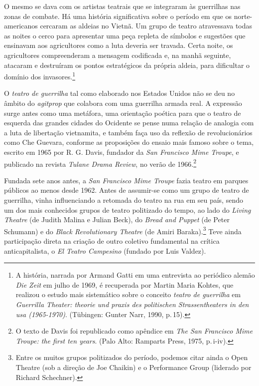 O mesmo se dava com os artistas teatrais que se integraram às guerrilhas
nas zonas de combate. Há uma história significativa sobre o período em
que os norte-americanos cercaram as aldeias no Vietnã. Um grupo de
teatro atravessava todas as noites o cerco para apresentar uma peça
repleta de símbolos e sugestões que ensinavam aos agricultores como a
luta deveria ser travada. Certa noite, os agricultores compreenderam a
mensagem codificada e, na manhã seguinte, atacaram e destruíram os
pontos estratégicos da própria aldeia, para dificultar o domínio dos
invasores.\footnote{A história, narrada por Armand Gatti em uma
  entrevista ao periódico alemão {\it Die Zeit} em julho de 1969, é
  recuperada por Martin Maria Kohtes, que realizou o estudo mais
  sistemático sobre o conceito {\it teatro de guerrilha} em
  {\it Guerrilla Theater: theorie und praxis des politischen
  Strassentheaters in den {\sc usa} (1965-1970)}. (Tübingen: Gunter Narr,
  1990, p.\,15).}

\subject{Conceito estadunidense de Teatro de guerrilha}

O {\it teatro de guerrilha} tal como elaborado nos Estados Unidos não se
deu no âmbito do {\it agitprop} que colabora com uma guerrilha armada
real. A expressão surge antes como uma metáfora, uma orientação poética
para que o teatro de esquerda das grandes cidades do Ocidente se pense
numa relação de analogia com a luta de libertação vietnamita, e também
faça uso da reflexão de revolucionários como Che Guevara, conforme as
proposições do ensaio mais famoso sobre o tema, escrito em 1965 por R.
G. Davis, fundador da {\it San Francisco Mime Troupe}, e publicado na
revista {\it Tulane Drama Review}, no verão de 1966.\footnote{O texto de
  Davis foi republicado como apêndice em {\it The San Francisco Mime
  Troupe: the first ten years}. (Palo Alto: Ramparts Press, 1975, p.\,i-iv).}

Fundada sete anos antes, a {\it San Francisco Mime Troupe} fazia teatro
em parques públicos ao menos desde 1962. Antes de assumir-se como um
grupo de teatro de guerrilha, vinha influenciando a retomada do teatro
na rua em seu país, sendo um dos mais conhecidos grupos de teatro
politizado do tempo, ao lado do {\it Living Theatre} (de Judith Malina e
Julian Beck), do {\it Bread and Puppet} (de Peter Schumann) e do
{\it Black Revolutionary Theatre} (de Amiri Baraka).\footnote{Entre os
  muitos grupos politizados do período, podemos citar ainda o Open
  Theatre (sob a direção de Joe Chaikin) e o Performance Group (liderado
  por Richard Schechner).} Teve ainda participação direta na criação de
outro coletivo fundamental na crítica anticapitalista, o {\it El Teatro
Campesino} (fundado por Luis Valdez).

